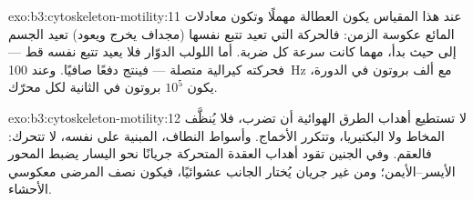 \begin{solution}{exo:b3:cytoskeleton-motility:11}
عند هذا المقياس يكون العطالة مهملًا وتكون معادلات المائع
عكوسة الزمن: فالحركة التي تعيد تتبع نفسها (مجداف يخرج
ويعود) تعيد الجسم إلى حيث بدأ، مهما كانت سرعة كل
ضربة. أما اللولب الدوّار فلا يعيد تتبع نفسه قط --- فحركته
كيرالية متصلة --- فينتج دفعًا صافيًا. وعند \qty{100}{Hz}
مع ألف بروتون في الدورة، يكون $10^{5}$ بروتون في الثانية لكل
محرّك.
\end{solution}

\begin{solution}{exo:b3:cytoskeleton-motility:12}
لا تستطيع أهداب الطرق الهوائية أن تضرب، فلا يُنظَّف المخاط ولا البكتيريا،
وتتكرر الأخماج. وأسواط النطاف، المبنية على  نفسه،
لا تتحرك: فالعقم. وفي الجنين تقود أهداب العقدة المتحركة
جريانًا نحو اليسار يضبط المحور الأيسر--الأيمن؛ ومن غير جريان يُختار الجانب
عشوائيًا، فيكون نصف المرضى معكوسي الأحشاء.
\end{solution}

